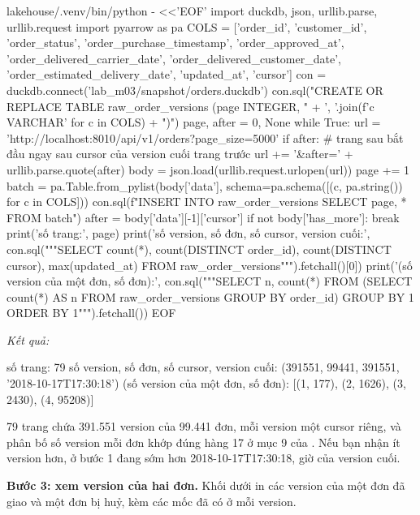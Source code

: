 \begin{codeblock}
lakehouse/.venv/bin/python - <<'EOF'
import duckdb, json, urllib.parse, urllib.request
import pyarrow as pa
COLS = ['order_id', 'customer_id', 'order_status', 'order_purchase_timestamp',
        'order_approved_at', 'order_delivered_carrier_date',
        'order_delivered_customer_date', 'order_estimated_delivery_date',
        'updated_at', 'cursor']
con = duckdb.connect('lab_m03/snapshot/orders.duckdb')
con.sql("CREATE OR REPLACE TABLE raw_order_versions (page INTEGER, "
        + ', '.join(f'{c} VARCHAR' for c in COLS) + ")")
page, after = 0, None
while True:
    url = 'http://localhost:8010/api/v1/orders?page_size=5000'
    if after:  # trang sau bắt đầu ngay sau cursor của version cuối trang trước
        url += '&after=' + urllib.parse.quote(after)
    body = json.load(urllib.request.urlopen(url))
    page += 1
    batch = pa.Table.from_pylist(body['data'],
                                 schema=pa.schema([(c, pa.string()) for c in COLS]))
    con.sql(f"INSERT INTO raw_order_versions SELECT {page}, * FROM batch")
    after = body['data'][-1]['cursor']
    if not body['has_more']:
        break
print('số trang:', page)
print('số version, số đơn, số cursor, version cuối:', con.sql("""SELECT count(*),
  count(DISTINCT order_id), count(DISTINCT cursor), max(updated_at)
  FROM raw_order_versions""").fetchall()[0])
print('(số version của một đơn, số đơn):', con.sql("""SELECT n, count(*) FROM
  (SELECT count(*) AS n FROM raw_order_versions GROUP BY order_id)
  GROUP BY 1 ORDER BY 1""").fetchall())
EOF
\end{codeblock}
\textit{Kết quả:}
\begin{codeblock}
số trang: 79
số version, số đơn, số cursor, version cuối: (391551, 99441, 391551, '2018-10-17T17:30:18')
(số version của một đơn, số đơn): [(1, 177), (2, 1626), (3, 2430), (4, 95208)]
\end{codeblock}

79 trang chứa 391.551 version của 99.441 đơn, mỗi version một cursor riêng, và phân bố số version mỗi đơn khớp đúng hàng 17 ở mục 9 của . Nếu bạn nhận ít version hơn,  ở bước 1 đang sớm hơn 2018-10-17T17:30:18, giờ của version cuối.

\textbf{Bước 3: xem version của hai đơn.} Khối dưới in các version của một đơn đã giao và một đơn bị huỷ, kèm các mốc đã có ở mỗi version.

